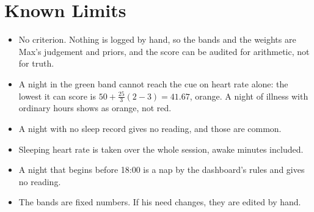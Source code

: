 \documentclass[11pt]{article}
\begin{document}
\section{Known Limits}
\begin{itemize}
\item No criterion. Nothing is logged by hand, so the bands and the weights are
  Max's judgement and priors, and the score can be audited for arithmetic, not
  for truth.
\item A night in the green band cannot reach the cue on heart rate alone: the
  lowest it can score is $50 + \tfrac{25}{3}(2 - 3) = 41.67$, orange. A night of
  illness with ordinary hours shows as orange, not red.
\item A night with no sleep record gives no reading, and those are common.
\item Sleeping heart rate is taken over the whole session, awake minutes included.
\item A night that begins before 18:00 is a nap by the dashboard's rules and gives
  no reading.
\item The bands are fixed numbers. If his need changes, they are edited by hand.
\end{itemize}
\end{document}
